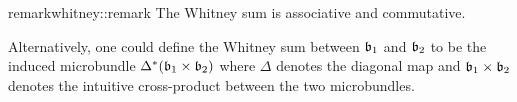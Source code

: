 \begin{mystatement}{remark}{whitney::remark}
    The Whitney sum is associative and commutative.
\end{mystatement}

\begin{myparagraph}
    Alternatively, one could define the Whitney sum between $\bb_1$ and $\bb_2$
    to be the induced microbundle $\ind{\Delta}(\bb_1 \cross \bb_2)$
    where $\Delta$ denotes the diagonal map and $\bb_1 \cross \bb_2$
    denotes the intuitive cross-product between the two microbundles.
\end{myparagraph}